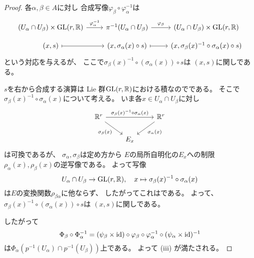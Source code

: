\documentclass[report]{jlreq}
\begin{document}
\begin{proof}
    各$\alpha, \beta \in A$に対し
    合成写像$\varphi_\beta \circ \varphi_\alpha^{-1}$は
    \begin{equation}
        \begin{tikzcd}
            (U_\alpha \cap U_\beta) \times \GL(r, \R)
                \ar{r}{\varphi_\alpha^{-1}}
                & \pi^{-1}(U_\alpha \cap U_\beta)
                \ar{r}{\varphi_\beta}
                & (U_\alpha \cap U_\beta) \times \GL(r, \R) \\[-1em]
            (x, s)
                \ar[mapsto]{r}
                & (x, \sigma_\alpha(x) \circ s)
                \ar[mapsto]{r}
                & (x, \sigma_\beta(x)^{-1} \circ \sigma_\alpha(x) \circ s)
        \end{tikzcd}
    \end{equation}
    という対応を与えるが、
    ここで$\sigma_\beta(x)^{-1} \circ (\sigma_\alpha(x)) \circ s$は
    $(x, s)$に関し{\smooth}である。
    \begin{innerproof}
        $s$を右から合成する演算は
        Lie 群$\operatorname{\mathrm{GL}}(r, \mathbb{R})$における積なので{\smooth}である。
        そこで$\sigma_\beta(x)^{-1} \circ \sigma_\alpha(x)$について考える。
        いま各$x \in U_\alpha \cap U_\beta$に対し
        \begin{equation}
            \begin{tikzcd}
                \R^r \ar{rr}{\sigma_\beta(x)^{-1} \circ \sigma_\alpha(x)}
                    \ar{dr}[swap]{\sigma_\beta(x)}
                    & & \R^r \ar{dl}{\sigma_\alpha(x)} \\
                & E_x
            \end{tikzcd}
        \end{equation}
        は可換であるが、
        $\sigma_\alpha, \sigma_\beta$は定め方から
        $E$の局所自明化の$E_x$への制限$\rho_\alpha(x), \rho_\beta(x)$の逆写像である。
        よって写像
        \begin{equation}
            U_\alpha \cap U_\beta \to \operatorname{\mathrm{GL}}(r, \mathbb{R}),
            \quad
            x \mapsto \sigma_\beta(x)^{-1} \circ \sigma_\alpha(x)
        \end{equation}
        は$E$の変換関数$\rho_{\beta\alpha}$に他ならず、
        したがってこれは{\smooth}である。
        よって、$\sigma_\beta(x)^{-1} \circ (\sigma_\alpha(x)) \circ s$は
        $(x, s)$に関し{\smooth}である。
    \end{innerproof}
    したがって
    \begin{equation}
        \Phi_\beta \circ \Phi_\alpha^{-1}
            = (\psi_\beta \times \mathrm{id}) \circ \varphi_\beta
                \circ \varphi_\alpha^{-1}
                \circ (\psi_\alpha \times \mathrm{id})^{-1}
    \end{equation}
    は$\Phi_\alpha(p^{-1}(U_\alpha) \cap p^{-1}(U_\beta))$上{\smooth}である。
    よって (iii) が満たされる。


\end{proof}
\end{document}
